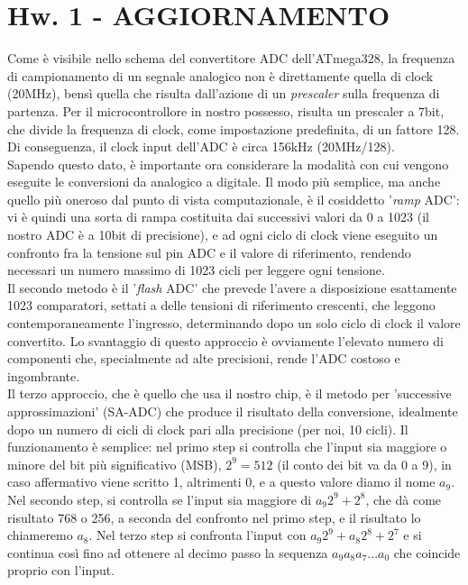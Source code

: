 \documentclass[journal, a4paper]{IEEEtran}
\begin{document}
\section{Hw. 1 - AGGIORNAMENTO}
Come è visibile nello schema del convertitore ADC dell'ATmega328, la frequenza di campionamento di un segnale analogico non è direttamente quella di clock (20MHz), bensì quella che risulta dall'azione di un \textit{prescaler} sulla frequenza di partenza. Per il microcontrollore in nostro possesso, risulta un prescaler a 7bit, che divide la frequenza di clock, come impostazione predefinita, di un fattore 128. Di conseguenza, il clock input dell'ADC è circa 156kHz (20MHz/128). \\

Sapendo questo dato, è importante ora considerare la modalità con cui vengono eseguite le conversioni da analogico a digitale. Il modo più semplice, ma anche quello più oneroso dal punto di vista computazionale, è il cosiddetto '\textit{ramp} ADC': vi è quindi una sorta di rampa costituita dai successivi valori da 0 a 1023 (il nostro ADC è a 10bit di precisione), e ad ogni ciclo di clock viene eseguito un confronto fra la tensione sul pin ADC e il valore di riferimento, rendendo necessari un numero massimo di 1023 cicli per leggere ogni tensione. \\
Il secondo metodo è il '\textit{flash} ADC' che prevede l'avere a disposizione esattamente 1023 comparatori, settati a delle tensioni di riferimento crescenti, che leggono contemporaneamente l'ingresso, determinando dopo un solo ciclo di clock il valore convertito. Lo svantaggio di questo approccio è ovviamente l'elevato numero di componenti che, specialmente ad alte precisioni, rende l'ADC costoso e ingombrante. \\
Il terzo approccio, che è quello che usa il nostro chip, è il metodo per 'successive approssimazioni' (SA-ADC) che produce il risultato della conversione, idealmente dopo un numero di cicli di clock pari alla precisione (per noi, 10 cicli). Il funzionamento è semplice: nel primo step si controlla che l'input sia maggiore o minore del bit più significativo (MSB), $2^9 = 512$ (il conto dei bit va da 0 a 9), in caso affermativo viene scritto 1, altrimenti 0, e a questo valore diamo il nome $a_9$. Nel secondo step, si controlla se l'input sia maggiore di $a_9 2^9 + 2^8$, che dà come risultato 768 o 256, a seconda del confronto nel primo step, e il risultato lo chiameremo $a_8$. Nel terzo step si confronta l'input con $a_9 2^9 + a_8 2^8 + 2^7$ e si continua così fino ad ottenere al decimo passo la sequenza $a_9 a_8 a_7 ... a_0$ che coincide proprio con l'input. \\
\end{document}
